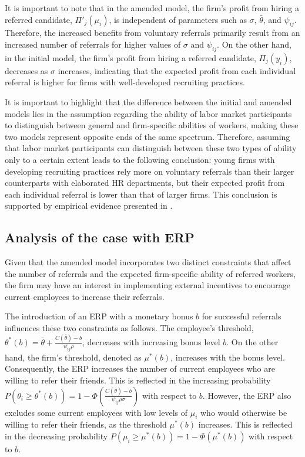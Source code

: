 \documentclass[12pt]{article}
\begin{document}
It is important to note that in the amended model, the firm's profit from hiring a referred candidate, $\Pi'_j(\mu_i)$, is independent of parameters such as $\sigma$, $\bar{\theta}$, and $\psi_{ij}$. Therefore, the increased benefits from voluntary referrals primarily result from an increased number of referrals for higher values of $\sigma$ and $\psi_{ij}$. On the other hand, in the initial model, the firm's profit from hiring a referred candidate, $\Pi_j(y_i)$, decreases as $\sigma$ increases, indicating that the expected profit from each individual referral is higher for firms with well-developed recruiting practices.

It is important to highlight that the difference between the initial and amended models lies in the assumption regarding the ability of labor market participants to distinguish between general and firm-specific abilities of workers, making these two models represent opposite ends of the same spectrum. Therefore, assuming that labor market participants can distinguish between these two types of ability only to a certain extent leads to the following conclusion: young firms with developing recruiting practices rely more on voluntary referrals than their larger counterparts with elaborated HR departments, but their expected profit from each individual referral is lower than that of larger firms. This conclusion is supported by empirical evidence presented in \cite{black2020network}.

\subsection{Analysis of the case with ERP}

Given that the amended model incorporates two distinct constraints that affect the number of referrals and the expected firm-specific ability of referred workers, the firm may have an interest in implementing external incentives to encourage current employees to increase their referrals.

The introduction of an ERP with a monetary bonus $b$ for successful referrals influences these two constraints as follows. The employee's threshold, $\theta^*(b) = \bar{\theta} + \frac{C(\bar{\theta}) - b}{\psi_{ij}\rho}$, decreases with increasing bonus level $b$. On the other hand, the firm's threshold, denoted as $\mu^*(b)$, increases with the bonus level. Consequently, the ERP increases the number of current employees who are willing to refer their friends. This is reflected in the increasing probability $P(\theta_i \geq \theta^*(b)) = 1 - \Phi\left(\frac{C(\bar{\theta}) - b}{\psi_{ij} \rho \sigma}\right)$ with respect to $b$. However, the ERP also excludes some current employees with low levels of $\mu_i$ who would otherwise be willing to refer their friends, as the threshold $\mu^*(b)$ increases. This is reflected in the decreasing probability $P(\mu_i \geq \mu^*(b)) = 1 - \Phi\left(\mu^*(b)\right)$ with respect to $b$.
\end{document}
